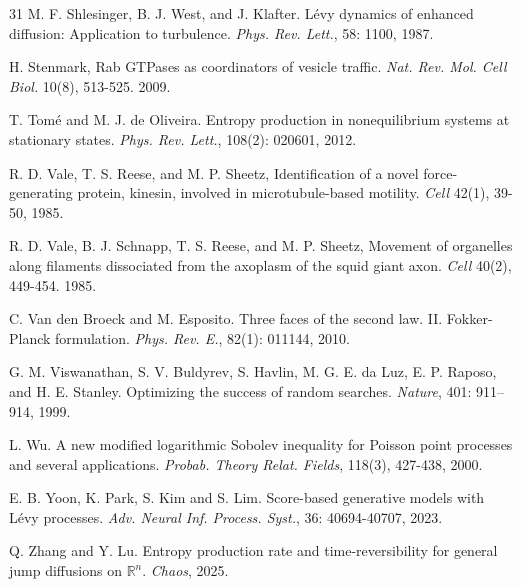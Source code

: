 \documentclass[10pt]{article}
\theoremstyle{definition}
\numberwithin{equation}{section}
\begin{document}
\begin{thebibliography}{31}
 M. F. Shlesinger, B. J. West, and J. Klafter. Lévy dynamics of enhanced diffusion: Application to turbulence. {\it Phys. Rev. Lett.}, 58: 1100, 1987.

H. Stenmark,
Rab GTPases as coordinators of vesicle traffic.
\textit{Nat. Rev. Mol. Cell Biol.} 10(8), 513-525. 2009.

 T. Tom\'{e} and M. J. de Oliveira. Entropy production in nonequilibrium systems at stationary states. {\it Phys. Rev. Lett.}, 108(2): 020601, 2012.

R. D. Vale, T. S. Reese, and M. P. Sheetz,
Identification of a novel force-generating protein, kinesin, involved in microtubule-based motility.
\textit{Cell} 42(1), 39-50, 1985.

R. D. Vale, B. J. Schnapp, T. S. Reese, and M. P. Sheetz,
Movement of organelles along filaments dissociated from the axoplasm of the squid giant axon.
\textit{Cell} 40(2), 449-454. 1985.

 C. Van den Broeck and M. Esposito. Three faces of the second law. II. Fokker-Planck formulation. {\it Phys. Rev. E.}, 82(1): 011144, 2010.

 G. M. Viswanathan, S. V. Buldyrev, S. Havlin, M. G. E. da Luz, E. P. Raposo, and H. E. Stanley. Optimizing the success of random searches. {\it Nature}, 401: 911–914, 1999.

 L. Wu. A new modified logarithmic Sobolev inequality for Poisson point processes and several applications. {\it Probab. Theory Relat. Fields}, 118(3), 427-438, 2000.


 E. B. Yoon, K. Park, S. Kim and S. Lim. Score-based generative models with L\'{e}vy processes. {\it Adv. Neural Inf. Process. Syst.}, 36: 40694-40707, 2023.

 Q. Zhang and Y. Lu. Entropy production rate and time-reversibility for general jump diffusions on $\mathbb{R}^n$. {\it Chaos}, 2025.




\end{thebibliography}
\end{document}
